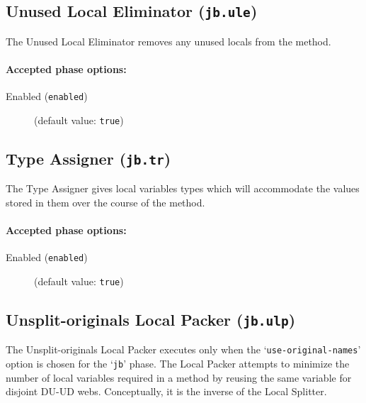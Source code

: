\documentclass{article}
\begin{document}
\subsection{Unused Local Eliminator ({\tt jb.ule})}

The Unused Local Eliminator removes any unused locals from the
method.


\paragraph{Accepted phase options:} 

\begin{description}

\item[Enabled ({\tt enabled})]
(default value: {\tt true})






\end{description}

\subsection{Type Assigner ({\tt jb.tr})}

The Type Assigner gives local variables types which will
accommodate the values stored in them over the course of the
method.


\paragraph{Accepted phase options:} 

\begin{description}

\item[Enabled ({\tt enabled})]
(default value: {\tt true})






\end{description}

\subsection{Unsplit-originals Local Packer ({\tt jb.ulp})}

The Unsplit-originals Local Packer executes only when the
`{\tt use-original-names}' option is chosen for the
`{\tt jb}' phase.  The Local Packer attempts to minimize
the number of local variables required in a method by reusing the
same variable for disjoint DU-UD webs. Conceptually, it is the
inverse of the Local Splitter.
\end{document}
